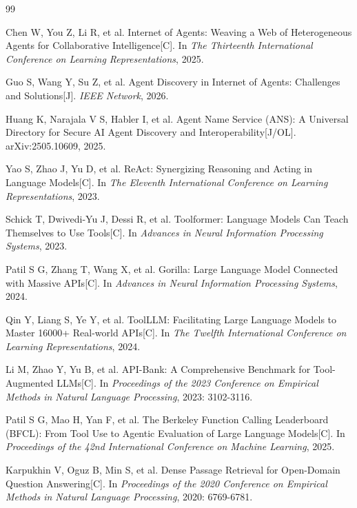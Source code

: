 \documentclass[10pt,a4paper,twocolumn,fontset=fandol]{ctexart}
\begin{document}
\sloppy
\begin{thebibliography}{99}

Chen W, You Z, Li R, et al.
\newblock Internet of Agents: Weaving a Web of Heterogeneous Agents for Collaborative Intelligence[C].
\newblock In \emph{The Thirteenth International Conference on Learning Representations}, 2025.

Guo S, Wang Y, Su Z, et al.
\newblock Agent Discovery in Internet of Agents: Challenges and Solutions[J].
\newblock \emph{IEEE Network}, 2026.

Huang K, Narajala V S, Habler I, et al.
\newblock Agent Name Service (ANS): A Universal Directory for Secure AI Agent Discovery and Interoperability[J/OL].
\newblock arXiv:2505.10609, 2025.

Yao S, Zhao J, Yu D, et al.
\newblock ReAct: Synergizing Reasoning and Acting in Language Models[C].
\newblock In \emph{The Eleventh International Conference on Learning Representations}, 2023.

Schick T, Dwivedi-Yu J, Dessi R, et al.
\newblock Toolformer: Language Models Can Teach Themselves to Use Tools[C].
\newblock In \emph{Advances in Neural Information Processing Systems}, 2023.

Patil S G, Zhang T, Wang X, et al.
\newblock Gorilla: Large Language Model Connected with Massive APIs[C].
\newblock In \emph{Advances in Neural Information Processing Systems}, 2024.

Qin Y, Liang S, Ye Y, et al.
\newblock ToolLLM: Facilitating Large Language Models to Master 16000+ Real-world APIs[C].
\newblock In \emph{The Twelfth International Conference on Learning Representations}, 2024.

Li M, Zhao Y, Yu B, et al.
\newblock API-Bank: A Comprehensive Benchmark for Tool-Augmented LLMs[C].
\newblock In \emph{Proceedings of the 2023 Conference on Empirical Methods in Natural Language Processing}, 2023: 3102-3116.

Patil S G, Mao H, Yan F, et al.
\newblock The Berkeley Function Calling Leaderboard (BFCL): From Tool Use to Agentic Evaluation of Large Language Models[C].
\newblock In \emph{Proceedings of the 42nd International Conference on Machine Learning}, 2025.

Karpukhin V, Oguz B, Min S, et al.
\newblock Dense Passage Retrieval for Open-Domain Question Answering[C].
\newblock In \emph{Proceedings of the 2020 Conference on Empirical Methods in Natural Language Processing}, 2020: 6769-6781.


\end{thebibliography}
\end{document}

